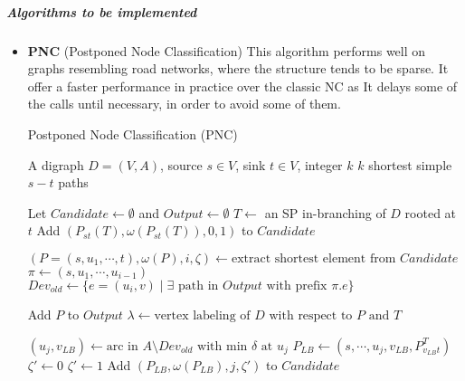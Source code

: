 \subparagraph{Algorithms to be implemented}
\begin{itemize}
    \item \textbf{PNC} (Postponed Node Classification)\cite{kSSP2023}
          This algorithm performs well on graphs resembling road networks,
          where the structure tends to be sparse. It offer a faster performance in practice over the classic NC
          as It delays some of the calls until necessary, in order to avoid some of them.

          \begin{algorithm}[H]
              \caption{Postponed Node Classification (PNC)\cite{kSSP2023}}
              \begin{algorithmic}[1]
                  \Require A digraph \( D = (V, A) \), source \( s \in V \), sink \( t \in V \), integer \( k \)
                  \Ensure \( k \) shortest simple \( s-t \) paths

                  \State Let \( Candidate \gets \emptyset \) and \( Output \gets \emptyset \)
                  \State \( T \gets \) an SP in-branching of \( D \) rooted at \( t \)
                  \State Add \( (P_{st}(T), \omega(P_{st}(T)), 0, 1) \) to \( Candidate \)

                  \State \((P = (s, u_1, \cdots, t), \omega(P), i, \zeta) \gets \text{extract shortest element from } Candidate\)
                  \State \(\pi \gets (s, u_1, \cdots, u_{i-1})\)
                  \State \( Dev_{old} \gets \{e = (u_i, v) \mid \exists \text{ path in } Output \text{ with prefix } \pi.e \} \)

                  \State Add \( P \) to \( Output \)
                  \State \(\lambda \gets \text{vertex labeling of } D \text{ with respect to } P \text{ and } T\)

                  \State \((u_j, v_{LB}) \gets \text{arc in } A \setminus Dev_{old} \text{ with min } \delta \text{ at } u_j\)
                  \State \( P_{LB} \gets (s, \cdots, u_j, v_{LB}, P^T_{v_{LB}t}) \)
                  \State \(\zeta' \gets 0\)
                  \State \(\zeta' \gets 1\)
                  \EndIf
                  \State Add \( (P_{LB}, \omega(P_{LB}), j, \zeta') \) to \( Candidate \)
                  \EndFor


\end{algorithmic}
\end{algorithm}
\end{itemize}
